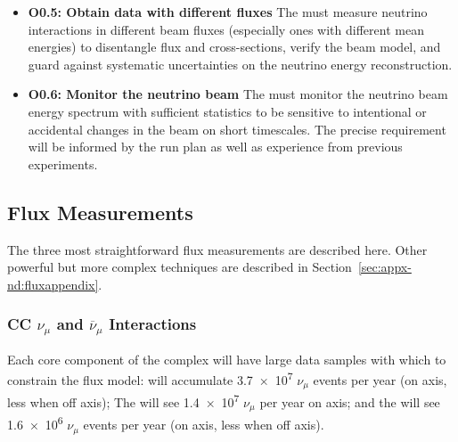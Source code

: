 \begin{itemize}
    \item{\bf O0.5: Obtain data with different fluxes} The  must measure neutrino interactions in different beam fluxes (especially ones with different mean energies) to disentangle flux and cross-sections, verify the beam model, and guard against systematic uncertainties on the neutrino energy reconstruction.
    
    \item{\bf O0.6: Monitor the neutrino beam} The  must monitor the neutrino beam energy spectrum with sufficient statistics to be sensitive to intentional or accidental changes in the beam on short timescales. The precise requirement will be informed by the run plan as well as experience from previous experiments. 
    
\end{itemize}

\subsection{Flux Measurements}

The three most straightforward flux measurements are described here. Other powerful but more complex techniques are described in Section~\ref{sec:appx-nd:fluxappendix}.

\subsubsection{CC $\nu_{\mu}$ and $\overline{\nu}_{\mu}$ Interactions}
Each core component of the  complex will have large data samples with which to constrain the flux model:   will accumulate \num{3.7e7}  $\nu_{\mu}$ events per year (on axis, less when off axis);  The  will see \num{1.4e7}  $\nu_{\mu}$ per year on axis; and the  will see \num{1.6e6}  $\nu_{\mu}$ events per year (on axis, less when off axis). 



